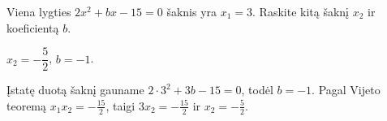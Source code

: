 \begin{salyga}
Viena lygties $2x^2 + bx - 15 = 0$ šaknis yra $x_1 = 3$. Raskite kitą šaknį $x_2$ ir koeficientą $b$.
\end{salyga}

\begin{atsakymas}
$x_2=-\dfrac52$, $b=-1$.
\end{atsakymas}

\begin{sprendimas}
Įstatę duotą šaknį gauname $2\cdot3^2+3b-15=0$, todėl $b=-1$. Pagal Vijeto teoremą $x_1x_2=-\frac{15}{2}$, taigi $3x_2=-\frac{15}{2}$ ir $x_2=-\frac52$.
\end{sprendimas}
